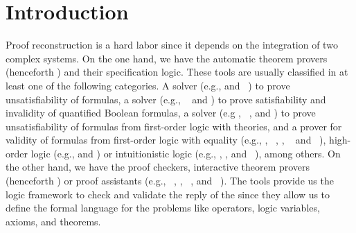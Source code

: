 \documentclass[../main.tex]{subfiles}
\begin{document}

\section{Introduction}
\label{sec:introduction}

Proof reconstruction is a hard labor since it depends on the
integration of two complex systems. On the one hand, we have the
automatic theorem provers (henceforth \ATP) and their specification
logic. These tools are usually classified in at least one of the
following categories. A \SAT solver (e.g., 
\cite{Moskewicz2001} and ~\cite{Een2004}) to prove
unsatisfiability of \CNF formulas, a  solver (e.g.,
~\cite{Klieber2014} and 
\cite{Lonsing2017}) to prove satisfiability and invalidity of
quantified Boolean formulas, a \SMT solver (e.g 
\cite{Barrett2011}, ~\cite{bouton2009}, and 
\cite{DeMoura2008}) to prove unsatisfiability of formulas from
first-order logic with theories, and a prover for validity of
formulas from first-order logic with equality (e.g., 
\cite{Schulz:AICOM-2002}, ~\cite{Otten2008}, \Metis
\cite{hurd2003first},  ~\cite{Weidenbach2009} and
~\cite{Riazanov1999}), high-order logic (e.g.,
 \cite{Benzmuller2008} and 
\cite{Brown2012}) or intuitionistic logic (e.g., 
\cite{Otten2008},  \cite{Schmitt2001}, and
~\cite{Tammet1997}), among others. On the other hand,
we have the proof checkers, interactive theorem provers (henceforth
\ITP) or proof assistants (e.g., \Agda~\cite{agdateam}, 
\cite{coqteam}, ~\cite{paulson1994isabelle}, and
~\cite{norrish2007hol}). The \ITP tools provide us the
logic framework to check and validate the reply of the \ATPs since
they allow us to define the formal language for the problems like
operators, logic variables, axioms, and theorems.
\end{document}

